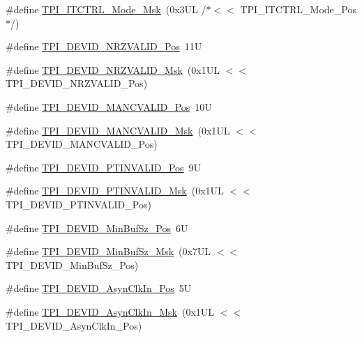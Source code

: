 \begin{DoxyCompactItemize}
\item 
\#define \mbox{\hyperlink{group___c_m_s_i_s___t_p_i_gad6f87550b468ad0920d5f405bfd3f017}{T\+P\+I\+\_\+\+I\+T\+C\+T\+R\+L\+\_\+\+Mode\+\_\+\+Msk}}~(0x3\+U\+L /$\ast$$<$$<$ T\+P\+I\+\_\+\+I\+T\+C\+T\+R\+L\+\_\+\+Mode\+\_\+\+Pos$\ast$/)
\item 
\#define \mbox{\hyperlink{group___c_m_s_i_s___t_p_i_ga9f46cf1a1708575f56d6b827766277f4}{T\+P\+I\+\_\+\+D\+E\+V\+I\+D\+\_\+\+N\+R\+Z\+V\+A\+L\+I\+D\+\_\+\+Pos}}~11U
\item 
\#define \mbox{\hyperlink{group___c_m_s_i_s___t_p_i_gacecc8710a8f6a23a7d1d4f5674daf02a}{T\+P\+I\+\_\+\+D\+E\+V\+I\+D\+\_\+\+N\+R\+Z\+V\+A\+L\+I\+D\+\_\+\+Msk}}~(0x1\+U\+L $<$$<$ T\+P\+I\+\_\+\+D\+E\+V\+I\+D\+\_\+\+N\+R\+Z\+V\+A\+L\+I\+D\+\_\+\+Pos)
\item 
\#define \mbox{\hyperlink{group___c_m_s_i_s___t_p_i_ga675534579d9e25477bb38970e3ef973c}{T\+P\+I\+\_\+\+D\+E\+V\+I\+D\+\_\+\+M\+A\+N\+C\+V\+A\+L\+I\+D\+\_\+\+Pos}}~10U
\item 
\#define \mbox{\hyperlink{group___c_m_s_i_s___t_p_i_ga4c3ee4b1a34ad1960a6b2d6e7e0ff942}{T\+P\+I\+\_\+\+D\+E\+V\+I\+D\+\_\+\+M\+A\+N\+C\+V\+A\+L\+I\+D\+\_\+\+Msk}}~(0x1\+U\+L $<$$<$ T\+P\+I\+\_\+\+D\+E\+V\+I\+D\+\_\+\+M\+A\+N\+C\+V\+A\+L\+I\+D\+\_\+\+Pos)
\item 
\#define \mbox{\hyperlink{group___c_m_s_i_s___t_p_i_ga974cccf4c958b4a45cb71c7b5de39b7b}{T\+P\+I\+\_\+\+D\+E\+V\+I\+D\+\_\+\+P\+T\+I\+N\+V\+A\+L\+I\+D\+\_\+\+Pos}}~9U
\item 
\#define \mbox{\hyperlink{group___c_m_s_i_s___t_p_i_ga1ca84d62243e475836bba02516ba6b97}{T\+P\+I\+\_\+\+D\+E\+V\+I\+D\+\_\+\+P\+T\+I\+N\+V\+A\+L\+I\+D\+\_\+\+Msk}}~(0x1\+U\+L $<$$<$ T\+P\+I\+\_\+\+D\+E\+V\+I\+D\+\_\+\+P\+T\+I\+N\+V\+A\+L\+I\+D\+\_\+\+Pos)
\item 
\#define \mbox{\hyperlink{group___c_m_s_i_s___t_p_i_ga3f7da5de2a34be41a092e5eddd22ac4d}{T\+P\+I\+\_\+\+D\+E\+V\+I\+D\+\_\+\+Min\+Buf\+Sz\+\_\+\+Pos}}~6U
\item 
\#define \mbox{\hyperlink{group___c_m_s_i_s___t_p_i_ga939e068ff3f1a65b35187ab34a342cd8}{T\+P\+I\+\_\+\+D\+E\+V\+I\+D\+\_\+\+Min\+Buf\+Sz\+\_\+\+Msk}}~(0x7\+U\+L $<$$<$ T\+P\+I\+\_\+\+D\+E\+V\+I\+D\+\_\+\+Min\+Buf\+Sz\+\_\+\+Pos)
\item 
\#define \mbox{\hyperlink{group___c_m_s_i_s___t_p_i_gab382b1296b5efd057be606eb8f768df8}{T\+P\+I\+\_\+\+D\+E\+V\+I\+D\+\_\+\+Asyn\+Clk\+In\+\_\+\+Pos}}~5U
\item 
\#define \mbox{\hyperlink{group___c_m_s_i_s___t_p_i_gab67830557d2d10be882284275025a2d3}{T\+P\+I\+\_\+\+D\+E\+V\+I\+D\+\_\+\+Asyn\+Clk\+In\+\_\+\+Msk}}~(0x1\+U\+L $<$$<$ T\+P\+I\+\_\+\+D\+E\+V\+I\+D\+\_\+\+Asyn\+Clk\+In\+\_\+\+Pos)
$$
\end{DoxyCompactItemize}
